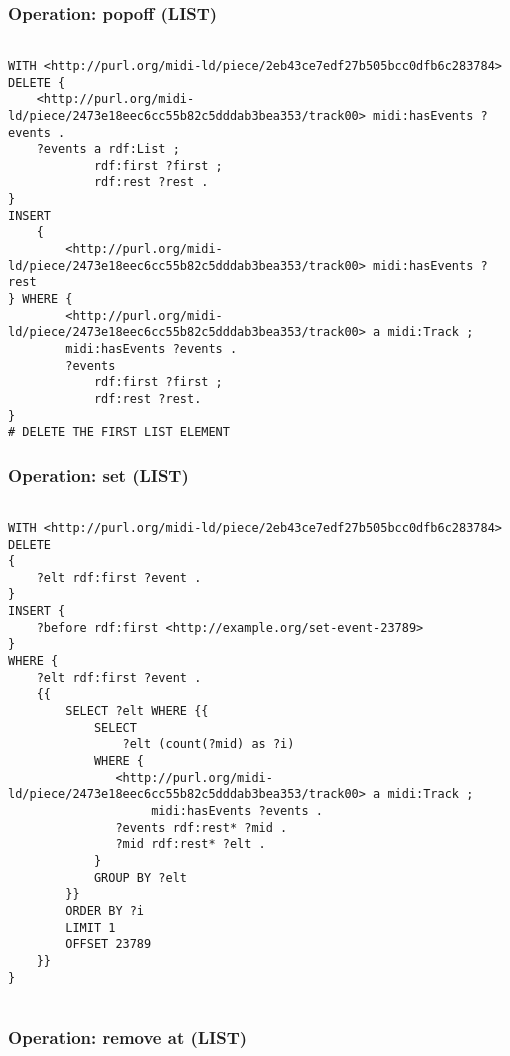 \subsubsection{Operation: popoff (LIST)}
\label{query:LIST:popoff}

\begin{lstlisting}[language=sparql]

WITH <http://purl.org/midi-ld/piece/2eb43ce7edf27b505bcc0dfb6c283784>
DELETE {
	<http://purl.org/midi-ld/piece/2473e18eec6cc55b82c5dddab3bea353/track00> midi:hasEvents ?events .
	?events a rdf:List ;
			rdf:first ?first ;
			rdf:rest ?rest .
}
INSERT
	{ 
		<http://purl.org/midi-ld/piece/2473e18eec6cc55b82c5dddab3bea353/track00> midi:hasEvents ?rest
} WHERE	{  
		<http://purl.org/midi-ld/piece/2473e18eec6cc55b82c5dddab3bea353/track00> a midi:Track ;
		midi:hasEvents ?events .
		?events
			rdf:first ?first ;
			rdf:rest ?rest.
}
# DELETE THE FIRST LIST ELEMENT

\end{lstlisting}

\subsubsection{Operation: set (LIST)}
\label{query:LIST:set}

\begin{lstlisting}[language=sparql]

WITH <http://purl.org/midi-ld/piece/2eb43ce7edf27b505bcc0dfb6c283784>
DELETE
{
  	?elt rdf:first ?event .
}
INSERT {
	?before rdf:first <http://example.org/set-event-23789>
}
WHERE {
  	?elt rdf:first ?event .
	{{
		SELECT ?elt WHERE {{
			SELECT
				?elt (count(?mid) as ?i)
			WHERE {
			   <http://purl.org/midi-ld/piece/2473e18eec6cc55b82c5dddab3bea353/track00> a midi:Track ;
			        midi:hasEvents ?events .
			   ?events rdf:rest* ?mid .
			   ?mid rdf:rest* ?elt .
			} 
			GROUP BY ?elt
		}}
		ORDER BY ?i
		LIMIT 1
		OFFSET 23789
	}}
}


\end{lstlisting}

\subsubsection{Operation: remove at (LIST)}
\label{query:LIST:remove_at}

